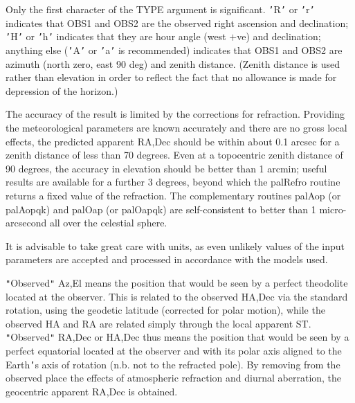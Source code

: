 \documentclass[twoside,11pt]{article}
\renewcommand{\_}{\texttt{\symbol{95}}}
\newcommand{\sstitem}{\item}
\newcommand{\sstitem}{\item}
\begin{document}
{{{         \sstitem
         Only the first character of the TYPE argument is significant.
         {\tt '}R{\tt '} or {\tt '}r{\tt '} indicates that OBS1 and OBS2 are the observed right
         ascension and declination;  {\tt '}H{\tt '} or {\tt '}h{\tt '} indicates that they are
         hour angle (west $+$ve) and declination;  anything else ({\tt '}A{\tt '} or
         {\tt '}a{\tt '} is recommended) indicates that OBS1 and OBS2 are azimuth
         (north zero, east 90 deg) and zenith distance.  (Zenith
         distance is used rather than elevation in order to reflect the
         fact that no allowance is made for depression of the horizon.)

         \sstitem
         The accuracy of the result is limited by the corrections for
         refraction.  Providing the meteorological parameters are
         known accurately and there are no gross local effects, the
         predicted apparent RA,Dec should be within about 0.1 arcsec
         for a zenith distance of less than 70 degrees.  Even at a
         topocentric zenith distance of 90 degrees, the accuracy in
         elevation should be better than 1 arcmin;  useful results
         are available for a further 3 degrees, beyond which the
         palRefro routine returns a fixed value of the refraction.
         The complementary routines palAop (or palAopqk) and palOap
         (or palOapqk) are self-consistent to better than 1 micro-
         arcsecond all over the celestial sphere.

         \sstitem
         It is advisable to take great care with units, as even
         unlikely values of the input parameters are accepted and
         processed in accordance with the models used.

         \sstitem
         {\tt "}Observed{\tt "} Az,El means the position that would be seen by a
         perfect theodolite located at the observer.  This is
         related to the observed HA,Dec via the standard rotation, using
         the geodetic latitude (corrected for polar motion), while the
         observed HA and RA are related simply through the local
         apparent ST.  {\tt "}Observed{\tt "} RA,Dec or HA,Dec thus means the
         position that would be seen by a perfect equatorial located
         at the observer and with its polar axis aligned to the
         Earth{\tt '}s axis of rotation (n.b. not to the refracted pole).
         By removing from the observed place the effects of
         atmospheric refraction and diurnal aberration, the
         geocentric apparent RA,Dec is obtained.

}}}
\end{document}
